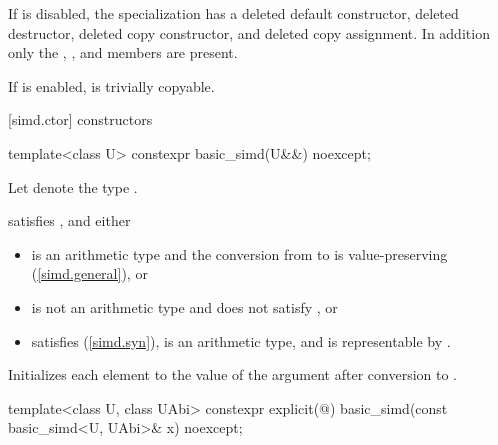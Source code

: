 If  is disabled, the specialization has a
deleted default constructor, deleted destructor, deleted copy constructor, and
deleted copy assignment.
In addition only the , , and
 members are present.

If  is enabled,  is
trivially copyable.

\pnum\ConversionsToIntrinsics

[simd.ctor]{ constructors}

\begin{itemdecl}
template<class U> constexpr basic_simd(U&&) noexcept;
\end{itemdecl}

\begin{itemdescr}
  \pnum Let  denote the type .

  \pnum\constraints
   satisfies , and either
  \begin{itemize}
    \item {} is an arithmetic type and the conversion from
       to  is value-preserving
      (\ref{simd.general}), or

    \item {} is not an arithmetic type and does not satisfy
      \tcode{\constexprwrapperlike}, or

    \item {} satisfies \tcode{\constexprwrapperlike} (\ref{simd.syn}),
       is an arithmetic type, and 
      is representable by .
  \end{itemize}

  \pnum\effects
  Initializes each element to the value of the argument after conversion to .
\end{itemdescr}

\begin{itemdecl}
template<class U, class UAbi>
  constexpr explicit(@\seebelow@) basic_simd(const basic_simd<U, UAbi>& x) noexcept;
\end{itemdecl}

